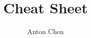 \title{Cheat Sheet}
\author{Anton Chen}
\newcommand{\CourseCode}{MATH 321}
\newcommand{\CourseName}{Real Variables II}
\newcommand{\School}{The University of British Columbia}
\newcommand{\Location}{Vancouver, B.C.}
